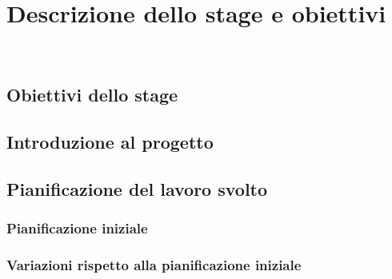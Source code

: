 
\chapter{Descrizione dello stage e obiettivi}
\label{cap:Descrizione dello stage e obiettivi}

\\

\section{Obiettivi dello stage}

\section{Introduzione al progetto}

\section{Pianificazione del lavoro svolto}

\subsection{Pianificazione iniziale}

\subsection{Variazioni rispetto alla pianificazione iniziale}

